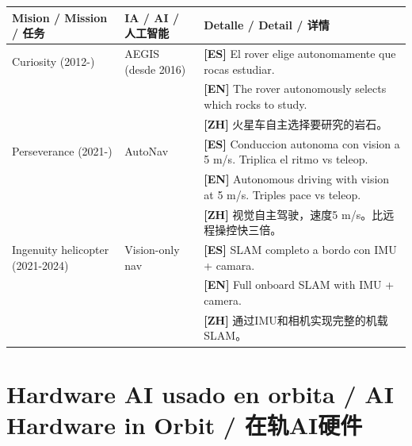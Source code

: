 \documentclass[11pt,a4paper]{report}
\begin{document}
\begin{center}
\small
\begin{longtable}{p{2.8cm}p{2.5cm}p{8.5cm}}
\toprule
\textbf{Mision / Mission / 任务} &
\textbf{IA / AI / 人工智能} &
\textbf{Detalle / Detail / 详情} \\
\midrule
\endhead
Curiosity (2012-) &
AEGIS (desde 2016) &
\textbf{[ES]} El rover elige autonomamente que rocas estudiar.\\
&&\textbf{[EN]} The rover autonomously selects which rocks to study.\\
&&\textbf{[ZH]} 火星车自主选择要研究的岩石。\\
\midrule
Perseverance (2021-) &
AutoNav &
\textbf{[ES]} Conduccion autonoma con vision a 5 m/s. Triplica el ritmo vs teleop.\\
&&\textbf{[EN]} Autonomous driving with vision at 5 m/s. Triples pace vs teleop.\\
&&\textbf{[ZH]} 视觉自主驾驶，速度5 m/s。比远程操控快三倍。\\
\midrule
Ingenuity helicopter (2021-2024) &
Vision-only nav &
\textbf{[ES]} SLAM completo a bordo con IMU + camara.\\
&&\textbf{[EN]} Full onboard SLAM with IMU + camera.\\
&&\textbf{[ZH]} 通过IMU和相机实现完整的机载SLAM。\\
\bottomrule
\end{longtable}
\end{center}

\chapter{Hardware AI usado en orbita / AI Hardware in Orbit / 在轨AI硬件}
\end{document}
